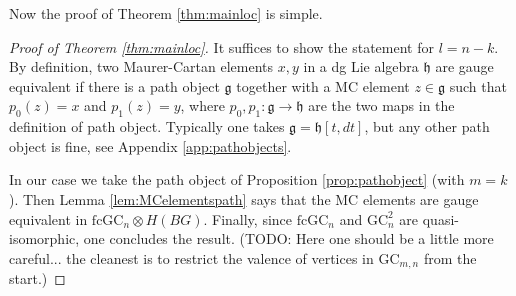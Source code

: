 \documentclass[a4paper]{amsart}
\theoremstyle{plain}
\newtheorem{prop}[thm]{Proposition}
\newtheorem{lemma}[thm]{Lemma}
\theoremstyle{definition}
\newcommand{\alg}[1]{\mathfrak{{#1}}}
\newcommand{\fGCc}{{\mathrm{fcGC}}}
\newcommand{\Graphs}{{\mathsf{Graphs}}}
\newcommand{\FM}{\mathsf{FM}}
\newcommand{\GC}{\mathrm{GC}}
\newcommand{\e}{\mathsf{e}}
\newcommand{\stG}{{}^*\Graphs}
\newcommand{\SO}{\mathit{SO}}
\begin{document}
Now the proof of Theorem \ref{thm:mainloc} is simple.

\begin{proof}[Proof of Theorem \ref{thm:mainloc}]
It suffices to show the statement for $l=n-k$.
By definition, two Maurer-Cartan elements $x,y$ in a dg Lie algebra $\alg h$ are gauge equivalent if there is a path object $\alg g$ together with a MC element $z\in \alg g$ such that $p_0(z)=x$ and $p_1(z)=y$, where $p_0,p_1:\alg g\to \alg h$ are the two maps in the definition of path object.
Typically one takes $\alg g=\alg h[t,dt]$, but any other path object is fine, see Appendix \ref{app:pathobjects}.

In our case we take the path object of Proposition \ref{prop:pathobject} (with $m=k$).
Then Lemma \ref{lem:MCelementspath} says that the MC elements are gauge equivalent in $\fGCc_n\otimes H(BG)$.
Finally, since $\fGCc_n$ and $\GC_n^{2}$ are quasi-isomorphic, one concludes the result.
(TODO: Here one should be a little more careful... the cleanest is to restrict the valence of vertices in $\GC_{m,n}$ from the start.) 
\end{proof}




%
%
%
%
%
%
\end{document}
